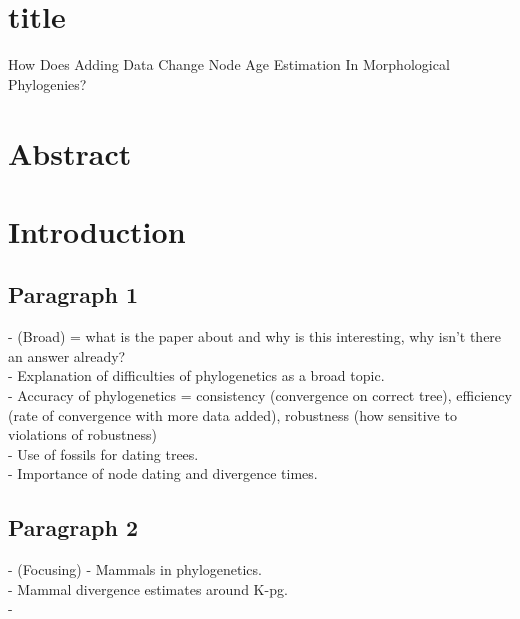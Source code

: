 \documentclass[a4paper,11pt]{article}
\begin{document}
\section{title}

How Does Adding Data Change Node Age Estimation In Morphological Phylogenies?

\section{Abstract}

\section{Introduction}


\subsection{Paragraph 1}
- (Broad) = what is the paper about and why is this interesting, why isn't there an answer already?\\
- Explanation of difficulties of phylogenetics as a broad topic.\\
- Accuracy of phylogenetics = consistency (convergence on correct tree), efficiency (rate of convergence with more data added), robustness (how sensitive to violations of robustness)\\
- Use of fossils for dating trees.\\
- Importance of node dating and divergence times.\\

\subsection{Paragraph 2}
- (Focusing)
- Mammals in phylogenetics.\\
- Mammal divergence estimates around K-pg.\\
- 
\end{document}
